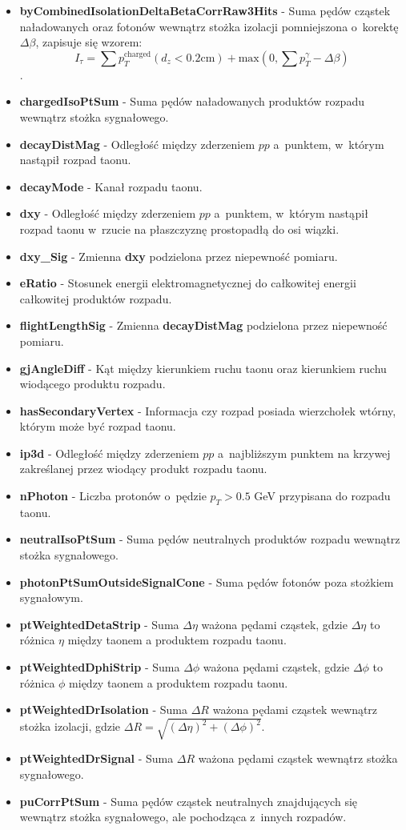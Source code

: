\documentclass{pracalicmgr}
\begin{document}
	\begin{itemize}
	\item \textbf{byCombinedIsolationDeltaBetaCorrRaw3Hits} - Suma pędów cząstek naładowanych oraz fotonów wewnątrz stożka izolacji pomniejszona o~korektę $\Delta\beta$, zapisuje się wzorem:  $$I_{\tau} = \sum p_T^{\mathrm{charged}}(d_z < 0.2 \mathrm{cm}) + \mathrm{max}(0, \sum p^{\gamma}_T - \Delta\beta)$$.
	\item \textbf{chargedIsoPtSum} - Suma pędów naładowanych produktów rozpadu wewnątrz stożka sygnałowego.
	\item \textbf{decayDistMag} - Odległość między zderzeniem $pp$ a~punktem, w~którym nastąpił rozpad taonu.
	\item \textbf{decayMode} - Kanał rozpadu taonu.
	\item \textbf{dxy} - Odległość między zderzeniem $pp$ a~punktem, w~którym nastąpił rozpad taonu w~rzucie na płaszczyznę prostopadłą do osi wiązki.
	\item \textbf{dxy\_Sig} - Zmienna \textbf{dxy} podzielona przez niepewność pomiaru.
	\item \textbf{eRatio} - Stosunek energii elektromagnetycznej do całkowitej energii całkowitej produktów rozpadu.
	\item \textbf{flightLengthSig} - Zmienna \textbf{decayDistMag} podzielona przez niepewność pomiaru. 
	\item \textbf{gjAngleDiff} - Kąt między kierunkiem ruchu taonu oraz kierunkiem ruchu wiodącego produktu rozpadu.
	\item \textbf{hasSecondaryVertex} - Informacja czy rozpad posiada wierzchołek wtórny, którym może być rozpad taonu.
	\item \textbf{ip3d} - Odległość między zderzeniem $pp$ a~najbliższym punktem na krzywej zakreślanej przez wiodący produkt rozpadu taonu.
	\item \textbf{nPhoton} - Liczba protonów o~pędzie $p_T > 0.5$ GeV przypisana do rozpadu taonu.
	\item \textbf{neutralIsoPtSum} - Suma pędów neutralnych produktów rozpadu wewnątrz stożka sygnałowego.
	\item \textbf{photonPtSumOutsideSignalCone} - Suma pędów fotonów poza stożkiem sygnałowym.
	\item \textbf{ptWeightedDetaStrip} - Suma $\Delta\eta$ ważona pędami cząstek, gdzie $\Delta\eta$ to różnica $\eta$ między taonem a produktem rozpadu taonu.
	\item \textbf{ptWeightedDphiStrip} - Suma $\Delta\phi$ ważona pędami cząstek, gdzie $\Delta\phi$ to różnica $\phi$ między taonem a produktem rozpadu taonu.
	\item \textbf{ptWeightedDrIsolation} - Suma $\Delta R$ ważona pędami cząstek wewnątrz stożka izolacji, gdzie $\Delta R = \sqrt{(\Delta\eta)^2 + (\Delta\phi)^2}$.
	\item \textbf{ptWeightedDrSignal} - Suma $\Delta R$ ważona pędami cząstek wewnątrz stożka sygnałowego.
	\item \textbf{puCorrPtSum} - Suma pędów cząstek neutralnych znajdujących się wewnątrz stożka sygnałowego, ale pochodząca z~innych rozpadów.
	\end{itemize}
	
\end{document}
